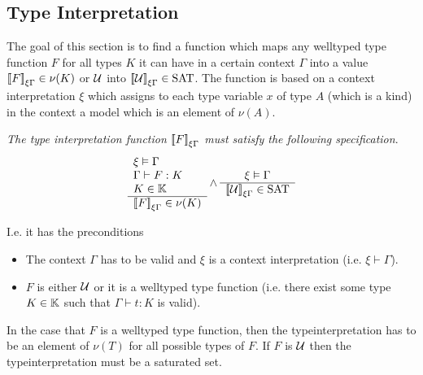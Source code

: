 \subsection{Type Interpretation}

The goal of this section is to find a function which maps any welltyped type
function $F$
for all types $K$ it can have in a certain context $\Gamma$ into a value
${{[\![} F{]\!]}}_{\xi\Gamma} \in \nu (K)$ or ${\cal U}$ into
${{[\![} {\cal U}{]\!]}}_{\xi\Gamma} \in \text{SAT}$. The function is based on a context
interpretation $\xi$ which assigns to each type variable $x$ of type $A$ (which
is a kind) in the context a model which is an element of $\nu(A)$.

\begin{definition}
    \label{SpecificationTypeInterpretation}
    \emph{The type interpretation function ${{[\![} F{]\!]}}_{\xi\Gamma}$ must
    satisfy the following specification}.
    $$
    \begin{array}{l} 
        \xi \vDash \Gamma
        \\
        \Gamma \vdash F : K
        \\
        K \in \mathbb{K}
     \\ \hline 
        {{[\![}F{]\!]}}_{\xi\Gamma} \in \nu(K)
    \end{array}
    \land
    \begin{array}{c} 
        \xi \vDash \Gamma
     \\ \hline 
        {{[\![}{\cal U}{]\!]}}_{\xi\Gamma} \in \text{SAT}
    \end{array}
    $$

    I.e. it has the preconditions
    \begin{itemize}
    \item The context $\Gamma$ has to be valid and $\xi$ is a context
        interpretation (i.e. $\xi \vdash \Gamma$).

    \item $F$ is either ${\cal U}$ or it is a welltyped type function (i.e. there
        exist some type $K \in \mathbb{K}$ such that $\Gamma \vdash t : K$ is
            valid).
    \end{itemize}

    In the case that $F$ is a welltyped type function, then the
    typeinterpretation has to be an element of $\nu(T)$ for all possible types
    of $F$. If $F$ is ${\cal U}$
    then the typeinterpretation must be a saturated set.
\end{definition}


